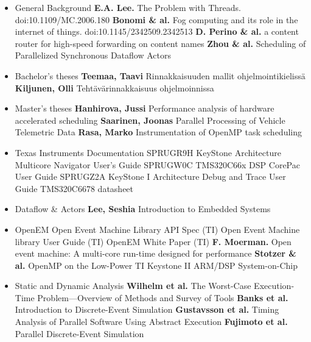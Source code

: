 \begin{itemize}[leftmargin=-.5in]
\item[] General Background
    \subitem \textbf{E.A. Lee.} The Problem with Threads. doi:10.1109/MC.2006.180
    \subitem \textbf{Bonomi \& al.} Fog computing and its role in the internet of things. doi:10.1145/2342509.2342513
    \subitem \textbf{D. Perino \& al.} a content router for high-speed forwarding on content names
    \subitem \textbf{Zhou \& al.} Scheduling of Parallelized Synchronous Dataflow Actors
\item[] Bachelor's theses
    \subitem \textbf{Teemaa, Taavi} Rinnakkaisuuden mallit ohjelmointikielissä
    \subitem \textbf{Kiljunen, Olli} Tehtävärinnakkaisuus ohjelmoinnissa
\item[] Master's theses
    \subitem \textbf{Hanhirova, Jussi} Performance analysis of hardware accelerated scheduling
    \subitem \textbf{Saarinen, Joonas} Parallel Processing of Vehicle Telemetric Data
    \subitem \textbf{Rasa, Marko} Instrumentation of OpenMP task scheduling
\item[] Texas Instruments Documentation
    \subitem SPRUGR9H KeyStone Architecture Multicore Navigator User's Guide
    \subitem SPRUGW0C TMS320C66x DSP CorePac User Guide
    \subitem SPRUGZ2A KeyStone I Architecture Debug and Trace User Guide
    \subitem TMS320C6678 datasheet
\item[] Dataflow \& Actors
    \subitem \textbf{Lee, Seshia} Introduction to Embedded Systems
\item[] OpenEM
    \subitem Open Event Machine Library API Spec (TI)
    \subitem Open Event Machine library User Guide (TI)
    \subitem OpenEM White Paper (TI)
    \subitem \textbf{F. Moerman.} Open event machine: A multi-core run-time designed for performance
    \subitem \textbf{Stotzer \& al.} OpenMP on the Low-Power TI Keystone II ARM/DSP System-on-Chip
\item[] Static and Dynamic Analysis
    \subitem \textbf{Wilhelm et al.} The Worst-Case Execution-Time Problem—Overview of Methods and Survey of Tools
    \subitem \textbf{Banks et al.} Introduction to Discrete-Event Simulation
    \subitem \textbf{Gustavsson et al.} Timing Analysis of Parallel Software Using Abstract Execution
    \subitem \textbf{Fujimoto et al.} Parallel Discrete-Event Simulation
\end{itemize}
